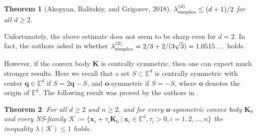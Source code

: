 \documentclass[12pt]{article}
\newtheorem{thm}{Theorem}
\newtheorem{prob}{Problem}
\newcommand{\xx}{\mathbf{x}}
\newcommand{\K}{\mathcal{K}}
\newcommand{\KK}{\mathbf K}
\newcommand{\Ee}{{\mathbb E}}
\begin{document}
\begin{thm}[Akopyan, Balitskiy, and Grigorev, 2018]\label{ABG-bound}
$\lambda_{\rm simplex}^{(d)}\leq (d+1)/2$ for all $d\geq 2$.
\end{thm}
Unfortunately, the above estimate does not seem to be sharp even for $d=2$. In fact, the authors asked in \cite{BezLan16} whether $\lambda_{\rm simplex}^{(2)}=2/3+2/(3\sqrt{3})= 1.0515\ldots$ holds. 



However, if the convex body $\KK$ is centrally symmetric, then one can expect much stronger results. Here we recall that a set $S \subset \Ee^d$ is centrally symmetric with center $\mathbf{q} \in \Ee^d$ if $S= 2\mathbf{q}-S$, and $\mathbf{o}$-symmetric if $S=-S$, where $\mathbf{o}$ denotes the origin of $\Ee^d$. The following result was proved by the authors in \cite{BezLan16}.

\begin{thm}\label{centrally symmetric convex bodies}
For all $d\ge 2$ and $n\ge 2$, and for every $\mathbf{o}$-symmetric convex body $\KK_0$ and every NS-family $\K := \{ \xx_i + \tau_i \KK_0\ |\  \xx_i\in \Ee^d, \tau_i>0, i=1,2,\ldots, n\}$ the inequality $\lambda(\K) \leq 1$ holds.
\end{thm}
\end{document}
